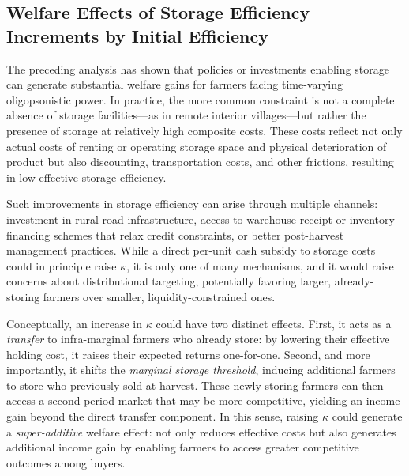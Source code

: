 








\subsection{Welfare Effects of Storage Efficiency Increments by Initial Efficiency}
\noindent The preceding analysis has shown that policies or investments enabling storage can generate substantial welfare gains for farmers facing time-varying oligopsonistic power. In practice, the more common constraint is not a complete absence of storage facilities---as in remote interior villages---but rather the presence of storage at relatively high composite costs. These costs reflect not only actual costs of renting or operating storage space and physical deterioration of product but also discounting, transportation costs, and other frictions, resulting in low effective storage efficiency. 

Such improvements in storage efficiency can arise through multiple channels: investment in rural road infrastructure, access to warehouse-receipt or inventory-financing schemes that relax credit constraints, or better post-harvest management practices. While a direct per-unit cash subsidy to storage costs could in principle raise $\kappa$, it is only one of many mechanisms, and it would raise concerns about distributional targeting, potentially favoring larger, already-storing farmers over smaller, liquidity-constrained ones.

Conceptually, an increase in $\kappa$ could have two distinct effects. First, it acts as a \emph{transfer} to infra-marginal farmers who already store: by lowering their effective holding cost, it raises their expected returns one-for-one. Second, and more importantly, it shifts the \emph{marginal storage threshold}, inducing additional farmers to store who previously sold at harvest. These newly storing farmers can then access a second-period market that may be more competitive, yielding an income gain beyond the direct transfer component. In this sense, raising $\kappa$ could generate a \emph{super-additive} welfare effect: not only reduces effective costs but also generates additional income gain by enabling farmers to access greater competitive outcomes among buyers.

